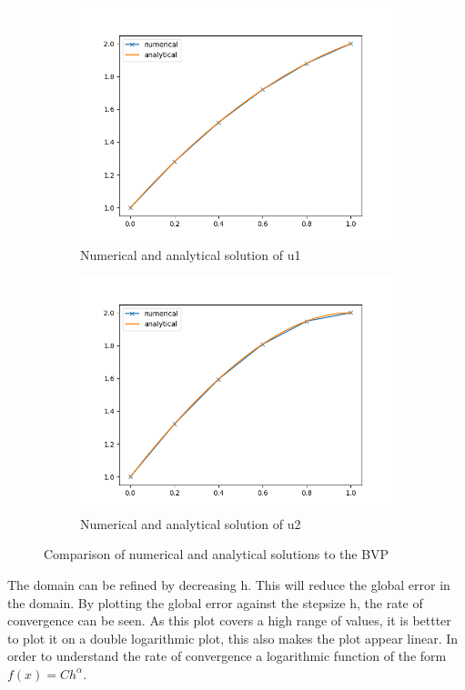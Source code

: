 \documentclass{article}
\begin{document}
\begin{figure}[H]
    \begin{subfigure}{.5\textwidth}
      \centering
      \includegraphics[width=.9\linewidth]{u1sym.png}
      \caption{Numerical and analytical solution of u1}
    \end{subfigure}%
    \begin{subfigure}{.5\textwidth}
      \centering
      \includegraphics[width=.9\linewidth]{u2sym.png}
      \caption{Numerical and analytical solution of u2}
    \end{subfigure}
    \caption{Comparison of numerical and analytical solutions to the BVP}
\end{figure}
The domain can be refined by decreasing h. This will reduce the global error in the domain. By plotting the global error against the stepsize h, the rate of convergence can be seen. As this plot covers a high range of values, it is bettter to plot it on a double logarithmic plot, this also makes the plot appear linear. In order to understand the rate of convergence a logarithmic function of the form $f(x) = Ch^{\alpha}$.
\end{document}

